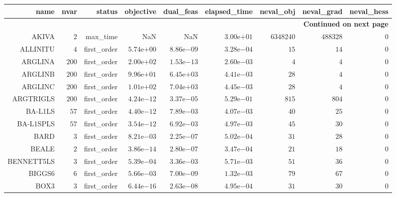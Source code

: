\begin{longtable}{rrrrrrrrr}
\hline
name & nvar & status & objective & dual\_feas & elapsed\_time & neval\_obj & neval\_grad & neval\_hess \\\hline
\endhead
\hline
\multicolumn{9}{r}{{\bfseries Continued on next page}}\\
\hline
\endfoot
\endlastfoot
AKIVA & \(     2\) & max\_time &       NaN &       NaN & \( 3.00\)e\(+01\) & \(6348240\) & \(488328\) & \(     0\) \\
ALLINITU & \(     4\) & first\_order & \( 5.74\)e\(+00\) & \( 8.86\)e\(-09\) & \( 3.28\)e\(-04\) & \(    15\) & \(    14\) & \(     0\) \\
ARGLINA & \(   200\) & first\_order & \( 2.00\)e\(+02\) & \( 1.53\)e\(-13\) & \( 2.60\)e\(-03\) & \(     4\) & \(     4\) & \(     0\) \\
ARGLINB & \(   200\) & first\_order & \( 9.96\)e\(+01\) & \( 6.45\)e\(+03\) & \( 4.41\)e\(-03\) & \(    28\) & \(     4\) & \(     0\) \\
ARGLINC & \(   200\) & first\_order & \( 1.01\)e\(+02\) & \( 7.04\)e\(+03\) & \( 4.45\)e\(-03\) & \(    28\) & \(     4\) & \(     0\) \\
ARGTRIGLS & \(   200\) & first\_order & \( 4.24\)e\(-12\) & \( 3.37\)e\(-05\) & \( 5.29\)e\(-01\) & \(   815\) & \(   804\) & \(     0\) \\
BA-L1LS & \(    57\) & first\_order & \( 4.40\)e\(-12\) & \( 7.89\)e\(-03\) & \( 4.07\)e\(-03\) & \(    40\) & \(    25\) & \(     0\) \\
BA-L1SPLS & \(    57\) & first\_order & \( 3.54\)e\(-12\) & \( 6.92\)e\(-03\) & \( 4.97\)e\(-03\) & \(    45\) & \(    30\) & \(     0\) \\
BARD & \(     3\) & first\_order & \( 8.21\)e\(-03\) & \( 2.25\)e\(-07\) & \( 5.02\)e\(-04\) & \(    31\) & \(    28\) & \(     0\) \\
BEALE & \(     2\) & first\_order & \( 3.86\)e\(-14\) & \( 2.80\)e\(-07\) & \( 3.47\)e\(-04\) & \(    21\) & \(    18\) & \(     0\) \\
BENNETT5LS & \(     3\) & first\_order & \( 5.39\)e\(-04\) & \( 3.36\)e\(-03\) & \( 5.71\)e\(-03\) & \(    51\) & \(    36\) & \(     0\) \\
BIGGS6 & \(     6\) & first\_order & \( 5.66\)e\(-03\) & \( 7.00\)e\(-09\) & \( 1.32\)e\(-03\) & \(    79\) & \(    67\) & \(     0\) \\
BOX3 & \(     3\) & first\_order & \( 6.44\)e\(-16\) & \( 2.63\)e\(-08\) & \( 4.95\)e\(-04\) & \(    31\) & \(    30\) & \(     0\) \\

\end{longtable}
